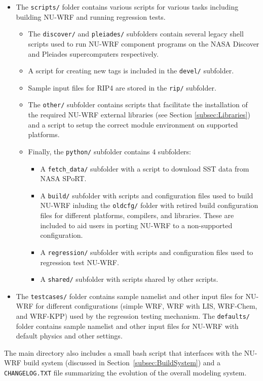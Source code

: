\begin{itemize}
  \item The \texttt{scripts/} folder contains various scripts for various tasks including
    building NU-WRF and running regression tests. 
    \begin{itemize}
    \item The  \texttt{discover/} and \texttt{pleiades/} subfolders contain several legacy shell scripts used to   run NU-WRF component programs on the NASA Discover and Pleiades supercomputers respectively. 
    \item A script for creating new tags is included in the \texttt{devel/} subfolder. 
    \item Sample input files for RIP4 are stored in the \texttt{rip/} subfolder.  
    \item The \texttt{other/} subfolder contains scripts that facilitate the installation of the required NU-WRF external libraries (see Section \ref{subsec:Libraries}) and a script to setup the correct module environment on supported platforms. 
    \item Finally, the  \texttt{python/} subfolder contains 4 subfolders:
    \begin{itemize}
    \item  A \texttt{fetch\_data/} subfolder with a script to download SST data from NASA SPoRT.  
    \item A \texttt{build/} subfolder with scripts and configuration files used to build NU-WRF 
    inluding the \texttt{oldcfg/} folder with retired build configuration files for different platforms, compilers, and    
    libraries. These are included to aid users in porting NU-WRF to a non-supported configuration.
    \item  A \texttt{regression/} subfolder with scripts and configuration files used to regression test NU-WRF.
    \item A \texttt{shared/} subfolder with scripts shared by other scripts. 
    \end{itemize}
    \end{itemize}
  \item The \texttt{testcases/} folder contains sample namelist and other 
    input files for NU-WRF for different configurations (simple WRF,
    WRF with LIS, WRF-Chem, and WRF-KPP) used by the regression testing mechanism.
    The \texttt{defaults/} folder contains sample namelist and other input files for NU-WRF 
    with default physics and other settings.

\end{itemize}

The main directory also includes a small bash script that interfaces with the NU-WRF build 
system (discussed in Section~\ref{subsec:BuildSystem}) and a 
\texttt{CHANGELOG.TXT} file summarizing the evolution of the overall modeling
system.

